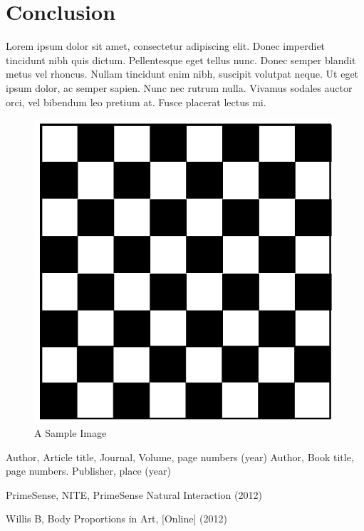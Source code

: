 \documentclass[twocolumn]{svjour3}          %
\begin{document}
\section{Conclusion}
\label{sec:5}
Lorem ipsum dolor sit amet, consectetur adipiscing elit. Donec imperdiet tincidunt nibh quis dictum. Pellentesque eget tellus nunc. Donec semper blandit metus vel rhoncus. Nullam tincidunt enim nibh, suscipit volutpat neque. Ut eget ipsum dolor, ac semper sapien. Nunc nec rutrum nulla. Vivamus sodales auctor orci, vel bibendum leo pretium at. Fusce placerat lectus mi.


\begin{figure}
	\begin{center}
			\includegraphics[width=0.9\columnwidth]{./bwgrid.jpg}
	\end{center}
	\caption{A Sample Image}
	\label{fig:1}
\end{figure}

\begin{thebibliography}{}
Author, Article title, Journal, Volume, page numbers (year)
Author, Book title, page numbers. Publisher, place (year)

PrimeSense, NITE,  PrimeSense Natural Interaction (2012)

Willis B,  Body Proportions in Art,  [Online] (2012)

\end{thebibliography}
\end{document}

